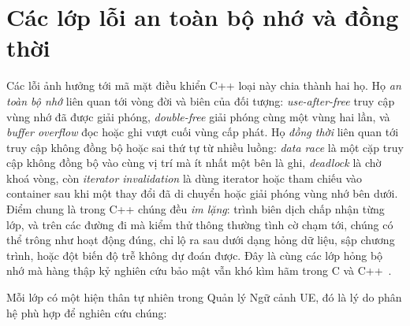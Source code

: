 \section{Các lớp lỗi an toàn bộ nhớ và đồng thời}\label{sec:defects}
Các lỗi ảnh hưởng tới mã mặt điều khiển C++ loại này chia thành hai họ. Họ \emph{an toàn bộ
nhớ} liên quan tới vòng đời và biên của đối tượng: \emph{use-after-free} truy cập vùng nhớ đã
được giải phóng, \emph{double-free} giải phóng cùng một vùng hai lần, và \emph{buffer overflow}
đọc hoặc ghi vượt cuối vùng cấp phát. Họ \emph{đồng thời} liên quan tới truy cập không đồng bộ
hoặc sai thứ tự từ nhiều luồng: \emph{data race} là một cặp truy cập không đồng bộ vào cùng vị
trí mà ít nhất một bên là ghi, \emph{deadlock} là chờ khoá vòng, còn \emph{iterator invalidation}
là dùng iterator hoặc tham chiếu vào container sau khi một thay đổi đã di chuyển hoặc giải phóng
vùng nhớ bên dưới. Điểm chung là trong C++ chúng đều \emph{im lặng}: trình biên dịch chấp nhận
từng lớp, và trên các đường đi mà kiểm thử thông thường tình cờ chạm tới, chúng có thể trông
như hoạt động đúng, chỉ lộ ra sau dưới dạng hỏng dữ liệu, sập chương trình, hoặc đột biến độ trễ
không dự đoán được. Đây là cùng các lớp hỏng bộ nhớ mà hàng thập kỷ nghiên cứu bảo mật vẫn khó
kìm hãm trong C và C++~\cite{szekeres2013sok}.

Mỗi lớp có một hiện thân tự nhiên trong Quản lý Ngữ cảnh UE, đó là lý do phân hệ phù hợp để
nghiên cứu chúng:


